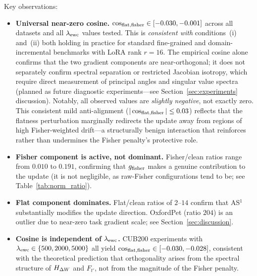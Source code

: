 Key observations:
\begin{itemize}
  \item \textbf{Universal near-zero cosine.}
    $\cos_{\mathrm{flat,fisher}} \in [-0.030, -0.001]$ across all datasets and all $\lambda_{\mathrm{ewc}}$ values tested.
    This is \emph{consistent with} conditions~(i) and~(ii) both holding in practice for
    standard fine-grained and domain-incremental benchmarks with LoRA rank $r=16$.
    The empirical cosine alone confirms that the two gradient components are near-orthogonal;
    it does not separately confirm spectral separation or restricted Jacobian isotropy,
    which require direct measurement of principal angles and singular value spectra
    (planned as future diagnostic experiments---see Section~\ref{sec:experiments} discussion).
    Notably, all observed values are \emph{slightly negative}, not exactly zero.
    This consistent mild anti-alignment ($|\cos_{\mathrm{flat,fisher}}| \leq 0.03$) reflects that the
    flatness perturbation marginally redirects the update away from regions of high
    Fisher-weighted drift---a structurally benign interaction that reinforces
    rather than undermines the Fisher penalty's protective role.
  \item \textbf{Fisher component is active, not dominant.}
    Fisher/clean ratios range from $0.010$ to $0.191$, confirming that
    $g_{\mathrm{fisher}}$ makes a genuine contribution to the update
    (it is not negligible, as raw-Fisher configurations tend to be;
    see Table~\ref{tab:norm_ratio}).
  \item \textbf{Flat component dominates.}
    Flat/clean ratios of $2$--$14$ confirm that AS$^1$ substantially modifies the update
    direction.
    OxfordPet (ratio $204$) is an outlier due to near-zero task gradient scale;
    see Section~\ref{sec:discussion}.
  \item \textbf{Cosine is independent of $\lambda_{\mathrm{ewc}}$.}
    CUB200 experiments with $\lambda_{\mathrm{ewc}} \in \{500, 2000, 5000\}$ all yield
    $\cos_{\mathrm{flat,fisher}} \in [-0.030, -0.028]$, consistent with the theoretical prediction
    that orthogonality arises from the spectral structure of $H_{\Delta W}$ and $F_{t'}$,
    not from the magnitude of the Fisher penalty.
\end{itemize}
